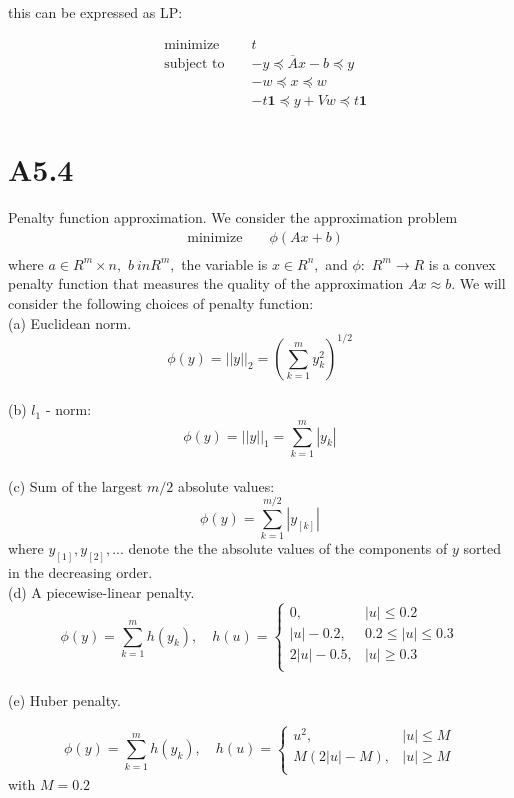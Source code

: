 \documentclass{article}
\begin{document}
this can be expressed as LP:

\begin{align*}
&\text{minimize } && 
t \\
&\text{subject to } 
&& - y \preceq \overline Ax - b \preceq y\\
& && -w \preceq x \preceq w \\
& && - t\boldsymbol{1} \preceq y + Vw \preceq t\boldsymbol{1}
\end{align*}

\section*{A5.4} %
Penalty function approximation. We consider the approximation problem
\begin{align*}
&\text{minimize } && 
\phi(Ax + b) \\
\end{align*}
where $a \in R^m\times n,$ $b \ in R^m,$ the variable is 
$x \in R^n,$ and $\phi : $ $R^m \rightarrow R$ is a convex penalty function that measures the quality of the approximation
$Ax \approx b.$ We will consider the following
choices of penalty function: \\

(a) Euclidean norm.
$$
\phi(y) = ||y||_2 = (\sum_{k=1}^m y_k^2)^{1/2}
$$
\\

(b) $l_1$ -  norm:
$$
\phi(y) = ||y||_1 = \sum_{k=1}^m |y_k|
$$
\\

(c) Sum of the largest $m/2$ absolute values:
$$
\phi(y) = \sum_{k=1}^{m/2} |y_{[k]}|
$$
where $y_{[1]}, y_{[2]},...$ denote the the absolute values of the components of $y$ sorted in the decreasing order.
\\

(d) A piecewise-linear penalty.
$$
\phi(y) = \sum_{k = 1}^m h(y_k), \quad 
h(u) = \begin{cases}
0, &|u| \leq 0.2\\
|u| - 0.2, &0.2 \leq |u| \leq 0.3 \\
2 |u| - 0.5, &|u| \geq 0.3 \\
\end{cases}
$$
\\

(e) Huber penalty. 

$$
\phi(y) = \sum_{k = 1}^m h(y_k), \quad 
h(u) = \begin{cases}
u^2, &|u| \leq M\\
M(2|u| - M), &|u| \geq M\\
\end{cases}
$$
with $M = 0.2$
\\
\end{document}
